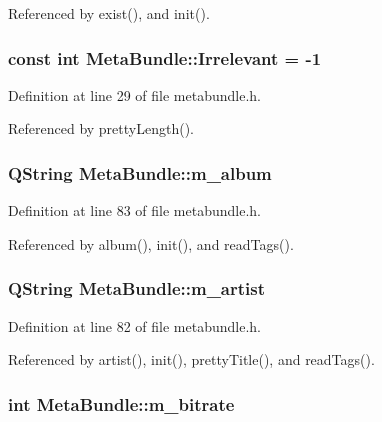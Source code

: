 Referenced by exist(), and init().
\subsubsection{\setlength{\rightskip}{0pt plus 5cm}const int {\bf Meta\-Bundle::Irrelevant} = -1\hspace{0.3cm}{\tt  [static]}}\label{classMetaBundle_MetaBundles1}




Definition at line 29 of file metabundle.h.

Referenced by pretty\-Length().
\subsubsection{\setlength{\rightskip}{0pt plus 5cm}QString {\bf Meta\-Bundle::m\_\-album}\hspace{0.3cm}{\tt  [private]}}\label{classMetaBundle_MetaBundler3}




Definition at line 83 of file metabundle.h.

Referenced by album(), init(), and read\-Tags().
\subsubsection{\setlength{\rightskip}{0pt plus 5cm}QString {\bf Meta\-Bundle::m\_\-artist}\hspace{0.3cm}{\tt  [private]}}\label{classMetaBundle_MetaBundler2}




Definition at line 82 of file metabundle.h.

Referenced by artist(), init(), pretty\-Title(), and read\-Tags().
\subsubsection{\setlength{\rightskip}{0pt plus 5cm}int {\bf Meta\-Bundle::m\_\-bitrate}\hspace{0.3cm}{\tt  [private]}}\label{classMetaBundle_MetaBundler8}




